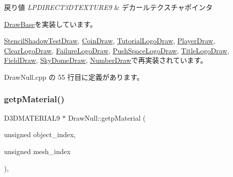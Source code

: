 \begin{DoxyRetVals}{戻り値}
{\em L\+P\+D\+I\+R\+E\+C\+T3\+D\+T\+E\+X\+T\+U\+R\+E9} & デカールテクスチャポインタ \\
\hline
\end{DoxyRetVals}


\mbox{\hyperlink{class_draw_base_a9f50a030778dbfca5ae45bb7908e0d58}{Draw\+Base}}を実装しています。



\mbox{\hyperlink{class_stencil_shadow_test_draw_a58f3699fa7ced20625edca807698aa85}{Stencil\+Shadow\+Test\+Draw}}, \mbox{\hyperlink{class_coin_draw_af99db1c0db2ed6b3ba429f23cd44279b}{Coin\+Draw}}, \mbox{\hyperlink{class_tutorial_logo_draw_abf06755b745dc62341a817a58d377659}{Tutorial\+Logo\+Draw}}, \mbox{\hyperlink{class_player_draw_ae69b46285241f390fbf62f6af2b5340d}{Player\+Draw}}, \mbox{\hyperlink{class_clear_logo_draw_ae67f9779fb2f9aa05d55c2167a36ddb0}{Clear\+Logo\+Draw}}, \mbox{\hyperlink{class_failure_logo_draw_a29a9642997edb92eeec83e8bd6b1ddee}{Failure\+Logo\+Draw}}, \mbox{\hyperlink{class_push_space_logo_draw_abfba58752543d8b2ccfe1e4003032dd3}{Push\+Space\+Logo\+Draw}}, \mbox{\hyperlink{class_title_logo_draw_a15ca49711182673a20439200dd8bc119}{Title\+Logo\+Draw}}, \mbox{\hyperlink{class_field_draw_a77cef7390fbe8fc68c0b325f4fcc839f}{Field\+Draw}}, \mbox{\hyperlink{class_sky_dome_draw_a99ec8e0a5aea708b66cf07c79a6449d1}{Sky\+Dome\+Draw}}, \mbox{\hyperlink{class_number_draw_a77d155c00ac4637154e62904556de05a}{Number\+Draw}}で再実装されています。



 Draw\+Null.\+cpp の 55 行目に定義があります。

\mbox{\label{class_draw_null_a0c1efe55fea325ad277594be6fe1e938}} 
\subsubsection{\texorpdfstring{getp\+Material()}{getpMaterial()}}
{\footnotesize\ttfamily D3\+D\+M\+A\+T\+E\+R\+I\+A\+L9 $\ast$ Draw\+Null\+::getp\+Material (\begin{DoxyParamCaption}\item[{unsigned}]{object\+\_\+index,  }\item[{unsigned}]{mesh\+\_\+index }\end{DoxyParamCaption})\hspace{0.3cm}{\ttfamily [override]}, {\ttfamily [virtual]}}




